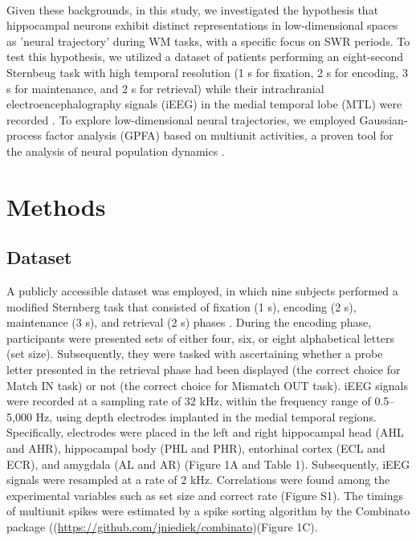 \documentclass[final,3p,times,twocolumn]{elsarticle}
\begin{document}
\indent
\\
Given these backgrounds, in this study, we investigated the hypothesis that hippocampal neurons exhibit distinct representations in low-dimensional spaces as 'neural trajectory' during WM tasks, with a specific focus on SWR periods. To test this hypothesis, we utilized a dataset of patients performing an eight-second Sternbeug task with high temporal resolution (1 s for fixation, 2 s for encoding, 3 s for maintenance, and 2 s for retrieval) while their intrachranial electroencephalography signals (iEEG) in the medial temporal lobe (MTL) were recorded \cite{boran_dataset_2020}. To explore low-dimensional neural trajectories, we employed Gaussian-process factor analysis (GPFA) based on multiunit activities, a proven tool for the analysis of neural population dynamics \cite{yu_gaussian-process_2009}.
\label{sec:introduction}

\section{Methods}
\subsection{Dataset}
A publicly accessible dataset \cite{boran_dataset_2020} was employed, in which nine subjects performed a modified Sternberg task that consisted of fixation (1 s), encoding (2 s), maintenance (3 s), and retrieval (2 s) phases \cite{boran_dataset_2020}. During the encoding phase, participants were presented sets of either four, six, or eight alphabetical letters (set size). Subsequently, they were tasked with ascertaining whether a probe letter presented in the retrieval phase had been displayed (the correct choice for Match IN task) or not (the correct choice for Mismatch OUT task). iEEG signals were recorded at a sampling rate of 32 kHz, within the frequency range of 0.5--5,000 Hz, using depth electrodes implanted in the medial temporal regions. Specifically, electrodes were placed in the left and right hippocampal head (AHL and AHR), hippocampal body (PHL and PHR), entorhinal cortex (ECL and ECR), and amygdala (AL and AR) (Figure 1A and Table 1). Subsequently, iEEG signals were resampled at a rate of 2 kHz. Correlations were found among the experimental variables such as set size and correct rate (Figure S1). The timings of multiunit spikes were estimated by a spike sorting algorithm \cite{niediek_reliable_2016} by the Combinato package ((\url{https://github.com/jniediek/combinato})(Figure 1C).
\end{document}
